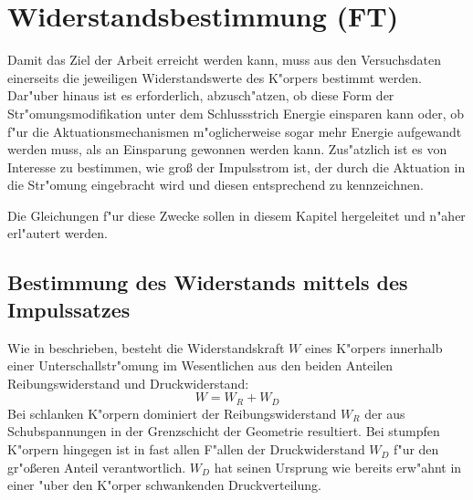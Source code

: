 \chapter{Widerstandsbestimmung (FT)}\label{s:widerstandsbestimmung}



Damit das Ziel der Arbeit erreicht werden kann, muss aus den Versuchsdaten einerseits die jeweiligen Widerstandswerte des K"orpers bestimmt werden. Dar"uber hinaus ist es erforderlich, abzusch"atzen, ob diese Form der Str"omungsmodifikation unter dem Schlussstrich Energie einsparen kann oder, ob f"ur die Aktuationsmechanismen m"oglicherweise sogar mehr Energie aufgewandt werden muss, als an Einsparung gewonnen werden kann.
Zus"atzlich ist es von Interesse zu bestimmen, wie gro\ss{} der Impulsstrom ist, der durch die Aktuation in die Str"omung eingebracht wird und diesen entsprechend zu kennzeichnen. 

Die Gleichungen f"ur diese Zwecke sollen in diesem Kapitel hergeleitet und n"aher erl"autert werden.

\section{Bestimmung des Widerstands mittels des Impulssatzes}
\label{sec:WueberImpulssatz}
Wie in  beschrieben, besteht die Widerstandskraft $W$ eines K"orpers innerhalb einer Unterschallstr"omung im Wesentlichen aus den beiden Anteilen Reibungswiderstand und Druckwiderstand:
	\begin{equation}
	\label{eq:W_zusammensetzung}
	W = W_R + W_D
	\end{equation}
Bei schlanken K"orpern dominiert der Reibungswiderstand $W_R$ der aus Schubspannungen in der Grenzschicht der Geometrie resultiert. Bei stumpfen K"orpern hingegen ist in fast allen F"allen der Druckwiderstand $W_D$ f"ur den gr"o\ss{}eren Anteil verantwortlich. $W_D$ hat seinen Ursprung wie bereits erw"ahnt in einer "uber den K"orper schwankenden Druckverteilung.  

